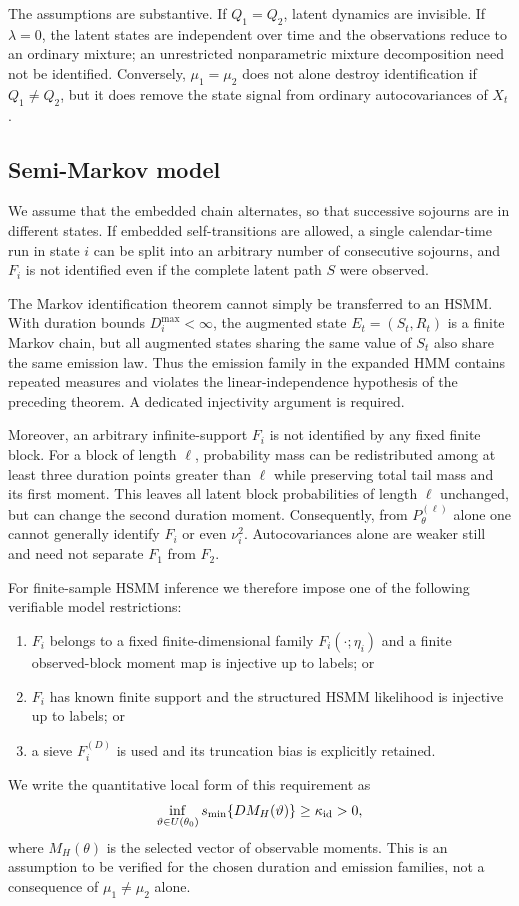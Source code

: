 \documentclass[11pt]{article}
\theoremstyle{definition}
\theoremstyle{remark}
\begin{document}
The assumptions are substantive.  If $Q_1=Q_2$, latent dynamics are
invisible.  If $\lambda=0$, the latent states are independent over time and
the observations reduce to an ordinary mixture; an unrestricted
nonparametric mixture decomposition need not be identified.  Conversely,
$\mu_1=\mu_2$ does not alone destroy identification if $Q_1\ne Q_2$, but it
does remove the state signal from ordinary autocovariances of $X_t$.

\subsection{Semi-Markov model}

We assume that the embedded chain alternates, so that successive sojourns are
in different states.  If embedded self-transitions are allowed, a single
calendar-time run in state $i$ can be split into an arbitrary number of
consecutive sojourns, and $F_i$ is not identified even if the complete latent
path $S$ were observed.

The Markov identification theorem cannot simply be transferred to an HSMM.
With duration bounds $D_i^{\max}<\infty$, the augmented state
$E_t=(S_t,R_t)$ is a finite Markov chain, but all augmented states sharing
the same value of $S_t$ also share the same emission law.  Thus the emission
family in the expanded HMM contains repeated measures and violates the
linear-independence hypothesis of the preceding theorem.  A dedicated
injectivity argument is required.

Moreover, an arbitrary infinite-support $F_i$ is not identified by any fixed
finite block.  For a block of length $\ell$, probability mass can be
redistributed among at least three duration points greater than $\ell$ while
preserving total tail mass and its first moment.  This leaves all latent block
probabilities of length $\ell$ unchanged, but can change the second duration
moment.  Consequently, from $P_\theta^{(\ell)}$ alone one cannot generally
identify $F_i$ or even $\nu_i^2$.  Autocovariances alone are weaker still and
need not separate $F_1$ from $F_2$.

For finite-sample HSMM inference we therefore impose one of the following
verifiable model restrictions:
\begin{enumerate}
 \item $F_i$ belongs to a fixed finite-dimensional family
       $F_i(\cdot;\eta_i)$ and a finite observed-block moment map is
injective up to labels; or
 \item $F_i$ has known finite support and the structured HSMM likelihood is
       injective up to labels; or
 \item a sieve $F_i^{(D)}$ is used and its truncation bias is explicitly
       retained.
\end{enumerate}
We write the quantitative local form of this requirement as
\begin{equation}
 \inf_{\vartheta\in U(\theta_0)}
 s_{\min}\{D M_H(\vartheta)\}\ge\kappa_{\rm id}>0,
 \label{eq:idmargin}
\end{equation}
where $M_H(\theta)$ is the selected vector of observable moments.  This is
an assumption to be verified for the chosen duration and emission families,
not a consequence of $\mu_1\ne\mu_2$ alone.
\end{document}
